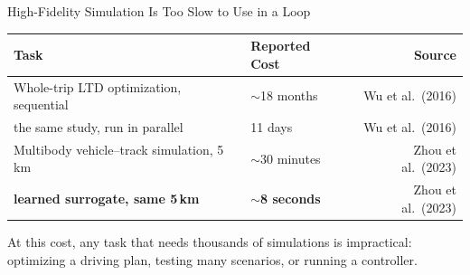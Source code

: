 \begin{frame}{High-Fidelity Simulation Is Too Slow to Use in a Loop}
  \vspace{0.3em}
  \centering
  \begin{tabular}{@{}llr@{}}
    \toprule
    \textbf{Task} & \textbf{Reported Cost} & \textbf{Source} \\
    \midrule
    Whole-trip LTD optimization, sequential  & $\sim$18 months
      & {\footnotesize Wu et al.\ (2016)} \\
    \quad the same study, run in parallel    & 11 days
      & {\footnotesize Wu et al.\ (2016)} \\[0.35em]
    Multibody vehicle--track simulation, 5\,km & $\sim$30 minutes
      & {\footnotesize Zhou et al.\ (2023)} \\
    \quad \textbf{learned surrogate, same 5\,km}
      & \textcolor{uniCrimson}{\textbf{$\sim$8 seconds}}
      & {\footnotesize Zhou et al.\ (2023)} \\
    \bottomrule
  \end{tabular}

  \vspace{1.0em}
  \begin{minipage}{0.88\textwidth}\small
    At this cost, any task that needs thousands of simulations is impractical:
    optimizing a driving plan, testing many scenarios, or running a controller.
  \end{minipage}

  \vspace{0.7em}
\end{frame}

